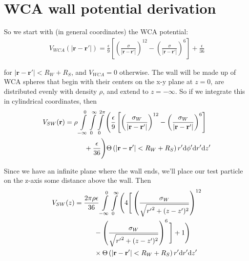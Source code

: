 \documentclass[letterpaper,twocolumn,amsmath,amssymb,prb]{revtex4-1}
\newcommand{\rr}{\textbf{r}}
\begin{document}
\section{WCA wall potential derivation}

So we start with (in general coordinates) the WCA potential:
\begin{align}
  V_{WCA}(|\rr - \rr'|) = \frac{\epsilon}{9} \left[ \left(\frac{\sigma}{|\rr - \rr'|}\right)^{12}
      - \left(\frac{\sigma}{|\rr - \rr'|}\right)^6\right] + \frac{\epsilon}{36}
\end{align}

for $|\rr - \rr'| < R_{W}+R_{S}$, and $V_{WCA} = 0$ otherwise. The wall will be
made up of WCA spheres that begin with their centers on the x-y plane
at $z = 0$, are distributed evenly with density $\rho$, and extend to $z
= -\infty$. So if we integrate this in cylindrical coordinates, then
\begin{align}
  V_{SW} (\rr) &= \rho \int\limits_{-\infty}^0 \int\limits_0^\infty
  \int\limits_0^{2\pi} \Bigg( \frac{\epsilon}{9} \left[
    \left(\frac{\sigma_W}{|\rr - \rr'|}\right)^{12} -
    \left(\frac{\sigma_W}{|\rr - \rr'|}\right)^6 \right] \notag \\
  & \hspace{1cm}+ \frac{\epsilon}{36} \Bigg) \Theta\left( |\rr-\rr'| <
  R_{W}+R_{S}\right) r'\textrm{d}\phi' \textrm{d}r' \textrm{d}z'
\end{align}

Since we have an infinite plane where the wall ends, we'll place our
test particle on the z-axis some distance above the wall. Then
\begin{align}
  V_{SW}(z) &= \frac{2\pi\rho\epsilon}{36}\int\limits_{-\infty}^0
  \int\limits_0^\infty \Bigg( 4 \Bigg[
    \left(\frac{\sigma_W}{\sqrt{{r'}^2 + (z-z')^2}}\right)^{12} \notag
    \\
    &\hspace{1cm}-\left(\frac{\sigma_W}{\sqrt{{r'}^2 + (z-z')^2}}\right)^6 \Bigg]
  + 1 \Bigg) \notag \\
    &\hspace{1cm} \times \Theta\left( |\rr-\rr'| < R_{W}+R_{S}\right) r'\textrm{d}r' \textrm{d}z'
\end{align}
\end{document}
